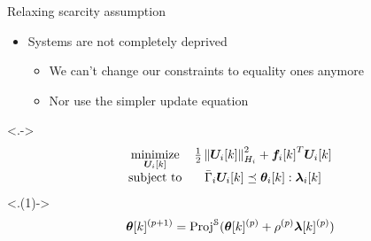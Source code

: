 \documentclass[handout,aspectratio=169]{beamer}
\begin{document}

\begin{frame}{Relaxing scarcity assumption}
  \begin{itemize}[<+(1)->]
    \item Systems are not completely deprived
          \begin{itemize}[<+(1)->]
            \item We can't change our constraints to equality ones anymore
            \item Nor use the simpler update equation
          \end{itemize}
  \end{itemize}

  \centering
  \onslide<.->{
    \begin{equation*}
      \begin{matrix}
        \minimize\limits_{\vec{U}_{i}[k]}&\frac{1}{2}\norm{\vec{U}_{i}[k]}^{2}_{H_{i}} + {\vec{f}_{i}[k]}^{T}\vec{U}_{i}[k]\\
        \mathrm{subject~ to} & \bar{\Gamma}_{i}\vec{U}_{i}[k] \preceq \thetaik:\lambdaik\\
      \end{matrix}
    \end{equation*}
  }
  \onslide<.(1)->{
    \begin{equation*}
      \boldsymbol{\theta}[k]^{(p+1)}=\operatorname{Proj}^{\mathcal{S}}(\boldsymbol{\theta}[k]^{(p)}+\rho^{(p)}\boldsymbol{\lambda}[k]^{(p)})
    \end{equation*}
  }

\end{frame}
\end{document}
